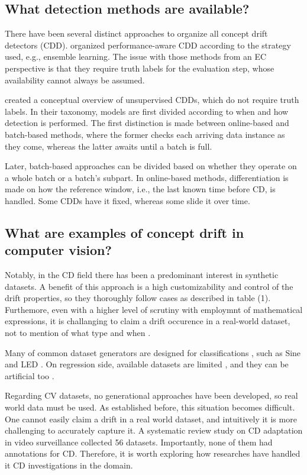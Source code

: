 \documentclass[a4paper]{article}
\begin{document}
\subsection{What detection methods are available?}

There have been several distinct approaches to organize all concept drift detectors (CDD). \cite{bayram_concept_2022} organized performance-aware CDD according to the strategy used, e.g., ensemble learning. The issue with those methods from an EC perspective is that they require truth labels for the evaluation step, whose availability cannot always be assumed.

\cite{gemaque_overview_2020} created a conceptual overview of unsupervised CDDs, which do not require truth labels. In their taxonomy, models are first divided according to when and how detection is performed. The first distinction is made between online-based and batch-based methods, where the former checks each arriving data instance as they come, whereas the latter awaits until a batch is full.

Later, batch-based approaches can be divided based on whether they operate on a whole batch or a batch's subpart. In online-based methods, differentiation is made on how the reference window, i.e., the last known time before CD, is handled. Some CDDs have it fixed, whereas some slide it over time.

\subsection{What are examples of concept drift in computer vision?}

Notably, in the CD  field there has been a predominant interest in synthetic datasets. A benefit of this approach is a high customizability and control of the drift properties, so they thoroughly follow cases as described in table (1). Furthemore, even with a higher level of scrutiny with employmnt of mathematical expressions, it is challanging to claim a drift occurence in a real-world dataset, not to mention of what type and when \cite{cavalcante_fedd_2016}.

Many of common dataset generators are designed for classifications \cite{barros_overview_2019}, such as Sine \cite{baena-garcia_early_2006} and LED \cite{frias-blanco_online_2015}. On regression side, available datasets are limited \cite{bayram_concept_2022}, and they can be artificial too \cite{cavalcante_fedd_2016}. 

Regarding CV datasets, no generational approaches have been developed, so real world data must be used. As established before, this situation becomes difficult. One cannot easily claim a drift in a real world dataset, and intuitively it is more challenging to accurately capture it. A systematic review study on CD adaptation in video surveillance \cite{goncalves_concept_2024} collected 56 datasets. Importantly, none of them had annotations for CD. Therefore, it is worth exploring how researches have handled it CD investigations in the domain.
\end{document}
